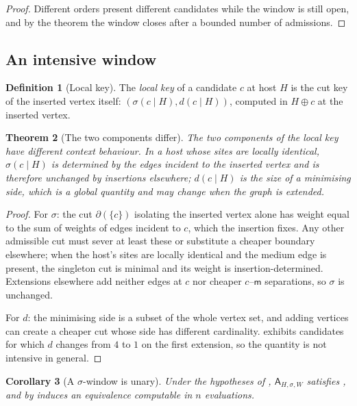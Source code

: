 \documentclass[11pt,twocolumn,a4paper]{article}
\theoremstyle{upthm}
\newtheorem{theorem}{Theorem}[section]
\newtheorem{corollary}[theorem]{Corollary}
\theoremstyle{definition}
\newtheorem{definition}[theorem]{Definition}
\theoremstyle{remark}
\newcommand{\med}{\mathsf{m}}
\newcommand{\cut}{\partial}
\newcommand{\sep}{\sigma}
\newcommand{\dep}{d}
\newcommand{\adm}{\mathsf{A}}
\begin{document}
\begin{proof}
Different orders present different candidates while the window is still
open, and by the theorem the window closes after a bounded number of
admissions.
\end{proof}



\subsection{An intensive window}

\begin{definition}[Local key]
\label{def:local}
The \emph{local key} of a candidate $c$ at host $H$ is the cut key of the
inserted vertex itself: $(\sep(c\mid H),\dep(c\mid H))$, computed in
$H\oplus c$ at the inserted vertex.
\end{definition}

\begin{theorem}[The two components differ]
\label{thm:sigma-intensive}
The two components of the local key have different context behaviour. In
a host whose sites are locally identical, $\sep(c\mid H)$ is determined
by the edges incident to the inserted vertex and is therefore unchanged
by insertions elsewhere; $\dep(c\mid H)$ is the size of a minimising
side, which is a global quantity and may change when the graph is
extended.
\end{theorem}

\begin{proof}
For $\sep$: the cut $\cut(\{c\})$ isolating the inserted vertex alone has
weight equal to the sum of weights of edges incident to $c$, which the
insertion fixes. Any other admissible cut must sever at least these or
substitute a cheaper boundary elsewhere; when the host's sites are
locally identical and the medium edge is present, the singleton cut is
minimal and its weight is insertion-determined. Extensions elsewhere add
neither edges at $c$ nor cheaper $c$--$\med$ separations, so $\sep$ is
unchanged.

For $\dep$: the minimising side is a subset of the whole vertex set, and
adding vertices can create a cheaper cut whose side has different
cardinality.  exhibits candidates for which $\dep$
changes from $4$ to $1$ on the first extension, so the quantity is not
intensive in general.
\end{proof}

\begin{corollary}[A $\sep$-window is unary]
\label{cor:sigma-unary}
Under the hypotheses of , $\adm_{H,\sep,W}$
satisfies , and by  induces an
equivalence computable in $n$ evaluations.
\end{corollary}
\end{document}

